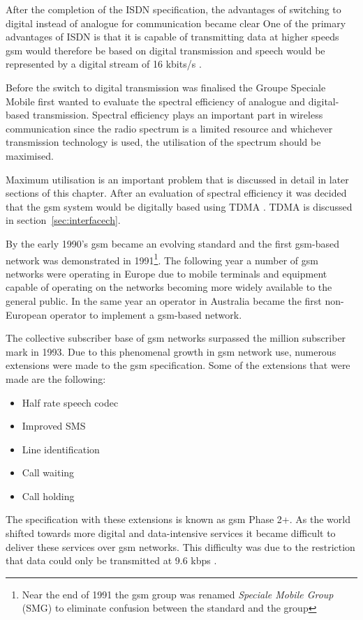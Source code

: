 After the completion of the \gls{ISDN} specification, the advantages of switching to digital instead of analogue for communication became clear\cite{GSM92} One of the primary advantages of \gls{ISDN} is that it is capable of transmitting data at higher speeds\cite{GSM92} \gls{gsm} would therefore be based on digital transmission and speech would be represented by a digital stream of 16 kbits/s \cite{GSM92}.

Before the switch to digital transmission was finalised the Groupe Speciale Mobile first wanted to evaluate the spectral efficiency of analogue and digital-based transmission\cite{GSM92}. Spectral efficiency plays an important part in wireless communication since the radio spectrum is a limited resource and whichever transmission technology is used, the utilisation of the spectrum should be maximised\cite{GSM92}. 

Maximum utilisation is an important problem that is discussed in detail in later sections of this chapter. After an evaluation of spectral efficiency it was decided that the \gls{gsm} system would be digitally based using \gls{TDMA} \cite{GSM92,GSMSysEngin}. \gls{TDMA} is discussed in section~\ref{sec:interfacech}.

By the early 1990’s \gls{gsm} became an evolving standard and the first \gls{gsm}-based network was demonstrated in 1991\footnote{Near the end of 1991 the \gls{gsm} group was renamed \emph{Speciale Mobile Group} (SMG) to eliminate confusion between the standard and the group}\cite{GSMArchitectureProtocolsServices,Eisenblatter}. The following year a number of \gls{gsm} networks were operating in Europe due to mobile terminals and equipment capable of operating on the networks becoming more widely available to the general public\cite{GSM92,Eisenblatter}. In the same year an operator in Australia became the first non-European operator to implement a \gls{gsm}-based network\cite{Eisenblatter}.

The collective subscriber base of \gls{gsm} networks surpassed the million subscriber mark in 1993\cite{GSM92}. Due to this phenomenal growth in \gls{gsm} network use, numerous extensions were made to the \gls{gsm} specification. 
Some of the extensions that were made are the following\cite{GSM92,GSMArchitectureProtocolsServices}:
\begin{itemize}
\item Half rate speech codec
\item Improved SMS
\item Line identification
\item Call waiting
\item Call holding
\end{itemize}
The specification with these extensions is known as \gls{gsm} Phase 2+. As the world shifted towards more digital and data-intensive services it became difficult to deliver these services over \gls{gsm} networks. This difficulty was due to the restriction that data could only be transmitted at 9.6 kbps \cite{GSM92,Karen2004}. 

